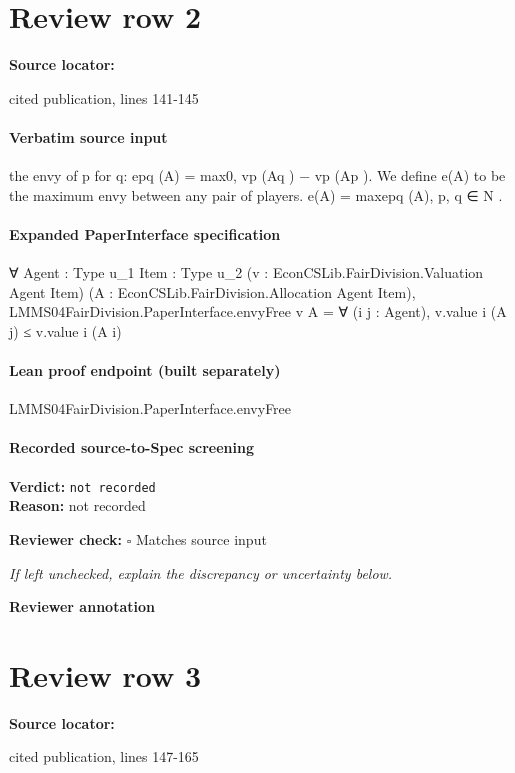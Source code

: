 \documentclass[10pt]{article}
\newcommand{\reviewerbox}{%
  \par\noindent\fbox{\parbox{0.96\linewidth}{\rule{0pt}{0.38in}}}\par
}
\newcommand{\reviewmatch}[1]{%
  \par\noindent\textbf{Reviewer check:} $\square$\; #1\par
  \noindent\emph{If left unchecked, explain the discrepancy or uncertainty below.}\par
}
\begin{document}
\section*{Review row 2}
\textbf{Source locator:} {\footnotesize\raggedright cited publication, lines 141-\allowbreak{}145\par}
\paragraph{Verbatim source input}
\begin{ReviewVerbatim}
the envy of p for q:
epq (A) = max{0, vp (Aq ) − vp (Ap )}.
We define e(A) to be the maximum envy between any pair
of players.
e(A) = max{epq (A), p, q ∈ N }.
\end{ReviewVerbatim}


\paragraph{Expanded PaperInterface specification}
\begin{ReviewVerbatim}
∀ {Agent : Type u_1} {Item : Type u_2} (v : EconCSLib.FairDivision.Valuation Agent Item)
  (A : EconCSLib.FairDivision.Allocation Agent Item),
  LMMS04FairDivision.PaperInterface.envyFree v A = ∀ (i j : Agent), v.value i (A j) ≤ v.value i (A i)
\end{ReviewVerbatim}

\paragraph{Lean proof endpoint (built separately)}\begin{ReviewVerbatim}
LMMS04FairDivision.PaperInterface.envyFree
\end{ReviewVerbatim}

\paragraph{Recorded source-to-Spec screening}
\textbf{Verdict:} \texttt{not recorded}
\\
\textbf{Reason:} not recorded
\reviewmatch{Matches source input}
\noindent\textbf{Reviewer annotation}\par
\reviewerbox
\clearpage
\hypertarget{source-claim-03adcb64d9b25a7f}{}
\section*{Review row 3}
\textbf{Source locator:} {\footnotesize\raggedright cited publication, lines 147-\allowbreak{}165\par}
\end{document}

